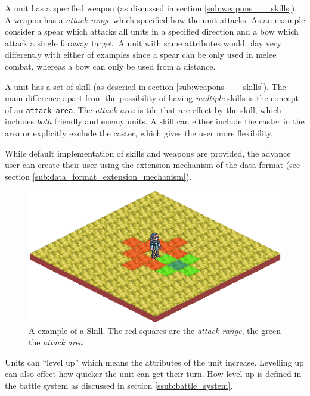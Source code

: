 A unit has a  specified weapon (as discussed in section \ref{sub:weapons___skills}).  A weapon has a \emph{attack range} which specified how the unit attacks.  As an example consider a spear which attacks all units in a specified direction and a bow which attack a single faraway target. A unit with same attributes would play very differently with either of examples since a spear can be only used in melee combat, whereas a bow can only be used from a distance.

A unit has a set of skill (as descried in section \ref{sub:weapons___skills}). The main difference apart from the possibility of having \emph{multiple} skills is the concept of an \texttt{attack area}.  The \emph{attack area} is tile that are effect by the skill, which includes \emph{both} friendly and enemy units. A skill can either include the caster in the area or explicitly exclude the caster, which gives the user more flexibility.

While default implementation of skills and weapons are provided, the advance user can create their user using the extension mechanism of the data format (see section \ref{sub:data_format_extension_mechanism}).

\begin{figure}[htbp]
	\centering
 		\includegraphics[scale=0.5]{figures/skill.png}
	\caption{A example of a Skill. The red squares are the \emph{attack range}, the green the \emph{attack area}}
	\label{fig:figures_engine_Skills}
\end{figure}

Units can ``level up'' which means the attributes  of the unit increase.  Levelling up can also effect how quicker the unit can get their turn. How level up is defined in the battle system as discussed in section \ref{ssub:battle_system}.



